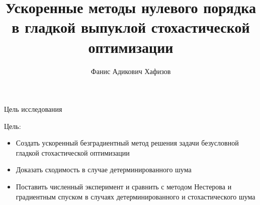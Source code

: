 \documentclass{beamer}
\title[\hbox to 56mm{Ускоренные безградиентные методы}]{Ускоренные методы нулевого порядка в гладкой выпуклой стохастической оптимизации}
\author[Ф.\,А. Хафизов]{Фанис Адикович Хафизов}
\institute{Московский физико-технический институт}
\date{\footnotesize
\par\smallskip\emph{Курс:} Автоматизация научных исследований\par (практика, В.\,В.~Стрижов)/Группа 105
\par\smallskip\emph{Эксперт:} к.ф.-м.н А.\,Н.~Безносиков
\par\smallskip\emph{Консультант:} А.\,И.~Богданов
\par\bigskip\small 2024}
\begin{document}
\begin{frame}
\thispagestyle{empty}
\maketitle
\end{frame}
\begin{frame}{Цель исследования}
\begin{block}{Цель:}
\begin{itemize}
 \item Создать ускоренный безградиентный метод решения задачи безусловной гладкой стохастической оптимизации
 \item Доказать сходимость в случае детерминированного шума
 \item Поставить численный эксперимент и сравнить с методом Нестерова и градиентным спуском в случаях детерминированного и стохастического шума
\end{itemize}

\end{block}
\end{frame}
\end{document}
